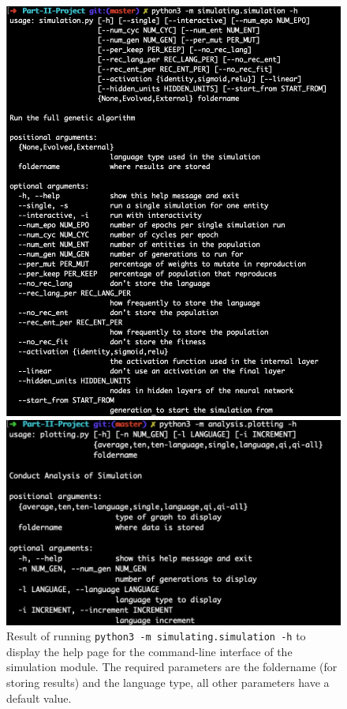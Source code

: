 \documentclass[12pt,a4paper,twoside,openright]{report}
\begin{document}
\begin{figure}[t]
   \centering
   \begin{minipage}{0.49\textwidth}
          \centering
          \captionsetup{width=.9\linewidth}
          \includegraphics[width=1.\linewidth]{figs/commandline}
          \caption{Result of running \texttt{python3 -m simulating.simulation -h} to display the help page for the command-line interface of the simulation module. The required parameters are the foldername (for storing results) and the language type, all other parameters have a default value.}
      \label{fig:commandline}
   \end{minipage}
   \begin{minipage}{0.49\textwidth}
          \centering
          \captionsetup{width=.9\linewidth}
          \includegraphics[width=1.\linewidth]{figs/commandline2}

\end{minipage}
\end{figure}
\end{document}
